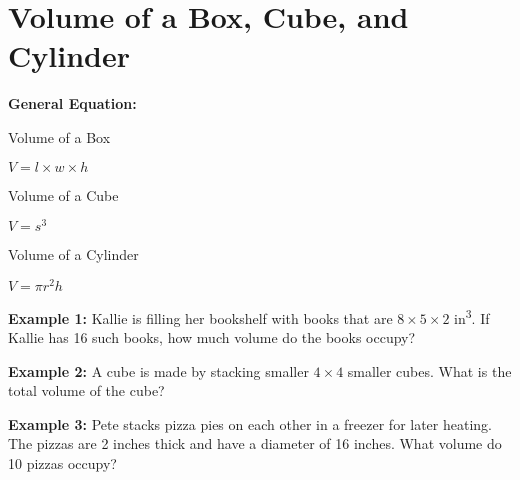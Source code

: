 \section[Volumes]{Volume of a Box, Cube, and Cylinder}

\textbf{General Equation:}

\begin{center}
\begin{multicols}{3}
Volume of a Box

$V=l\times w\times h$

Volume of a Cube

$V=s^3$

Volume of a Cylinder

$V=\pi r^2h$
\end{multicols}
\end{center}

\vfill\textbf{Example 1:} Kallie is filling her bookshelf with books that are $8\times5\times2$ in\textsuperscript{3}. If Kallie has 16 such books, how much volume do the books occupy?

\vfill\textbf{Example 2:} A cube is made by stacking smaller $4\times4$ smaller cubes. What is the total volume of the cube?

\vfill\textbf{Example 3:} Pete stacks pizza pies on each other in a freezer for later heating. The pizzas are 2 inches thick and have a diameter of 16 inches. What volume do 10 pizzas occupy?

